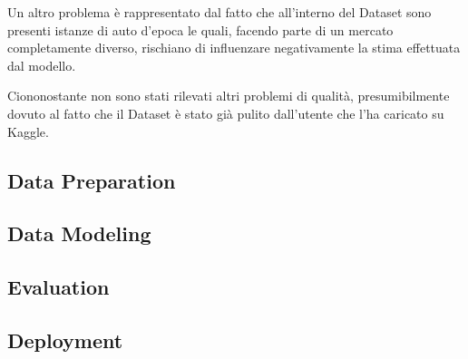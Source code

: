 Un altro problema è rappresentato dal fatto che all'interno del Dataset sono presenti istanze di auto d'epoca le quali, facendo parte di un mercato completamente diverso, rischiano di influenzare negativamente la stima effettuata dal modello. 

Ciononostante non sono stati rilevati altri problemi di qualità, presumibilmente dovuto al fatto che il Dataset è stato già pulito dall'utente che l'ha caricato su Kaggle.
\medskip

\subsection{Data Preparation}

\subsection{Data Modeling}

\subsection{Evaluation}

\subsection{Deployment}